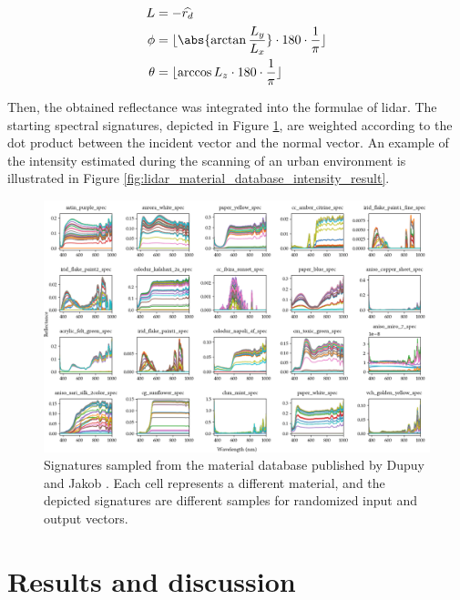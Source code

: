 \begin{gather}
    \label{eq:lidar_azimuth_elevation}
    \begin{aligned}
        L &= -\widehat{r_d}\\
        \phi &= \lfloor{\abs{\arctan{\frac{L_y}{L_x}}} \cdot 180 \cdot \frac{1}{\pi} \rfloor}\\
        \theta &= \lfloor{\arccos{L_z} \cdot 180 \cdot \frac{1}{\pi} \rfloor}\\
    \end{aligned}
\end{gather}

Then, the obtained reflectance was integrated into the formulae of \acrshort{lidar}. The starting spectral signatures, depicted in Figure \ref{fig:brdf_merl_examples}, are weighted according to the dot product between the incident vector and the normal vector. An example of the intensity estimated during the scanning of an urban environment is illustrated in Figure \ref{fig:lidar_material_database_intensity_result}. 

\begin{figure}[hbt]
	\centering
	\includegraphics[width=.95\linewidth]{figs/lidar_intensity/brdf_database_examples.png}
	\caption{Signatures sampled from the material database published by Dupuy and Jakob \cite{dupuy_adaptive_2018}. Each cell represents a different material, and the depicted signatures are different samples for randomized input and output vectors. }
	\label{fig:brdf_merl_examples}
\end{figure}

\section{Results and discussion}


